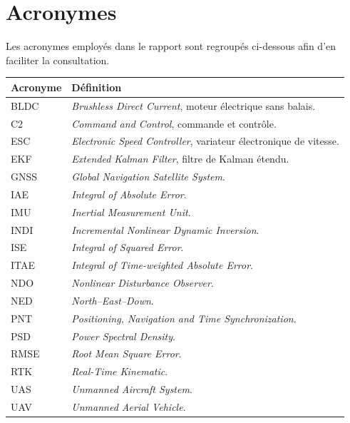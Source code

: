 \documentclass[11pt,a4paper,oneside]{report}
\newcommand{\english}[1]{\textit{#1}}
\begin{document}
	\tableofcontents
	\listoffigures
	\listoftables
	\clearpage
	
	\chapter*{Acronymes}
	Les acronymes employés dans le rapport sont regroupés ci-dessous afin d'en faciliter la consultation.
	
	\begin{longtable}{@{}L{3.0cm}L{11.6cm}@{}}
		\toprule
		\textbf{Acronyme} & \textbf{Définition}\\
		\midrule
		BLDC & \english{Brushless Direct Current}, moteur électrique sans balais.\\
		C2 & \english{Command and Control}, commande et contrôle.\\
		ESC & \english{Electronic Speed Controller}, variateur électronique de vitesse.\\
		EKF & \english{Extended Kalman Filter}, filtre de Kalman étendu.\\
		GNSS & \english{Global Navigation Satellite System}.\\
		IAE & \english{Integral of Absolute Error}.\\
		IMU & \english{Inertial Measurement Unit}.\\
		INDI & \english{Incremental Nonlinear Dynamic Inversion}.\\
		ISE & \english{Integral of Squared Error}.\\
		ITAE & \english{Integral of Time-weighted Absolute Error}.\\
		NDO & \english{Nonlinear Disturbance Observer}.\\
		NED & \english{North--East--Down}.\\
		PNT & \english{Positioning, Navigation and Time Synchronization}.\\
		PSD & \english{Power Spectral Density}.\\
		RMSE & \english{Root Mean Square Error}.\\
		RTK & \english{Real-Time Kinematic}.\\
		UAS & \english{Unmanned Aircraft System}.\\
		UAV & \english{Unmanned Aerial Vehicle}.\\
		\bottomrule
	\end{longtable}
	
\end{document}
